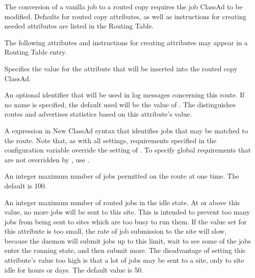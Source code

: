 The conversion of a vanilla job to a routed copy requires the
job ClassAd to be modified.
Defaults for routed copy attributes,
as well as instructions for creating needed attributes 
are listed in the Routing Table.

The following attributes and instructions for creating attributes
may appear in a Routing Table entry.

\begin{description}

\item[GridResource] Specifies the value for the 
attribute that will be inserted into the routed copy ClassAd.

\item[Name] An optional identifier that will be used in log
messages concerning this route.  If no name is specified, the default
used will be the value of .
The  distinguishes routes and advertises
statistics based on this attribute's value.

\item[Requirements] A  expression in New ClassAd
syntax that identifies jobs that may be matched to the route.  Note
that, as with all settings, requirements specified in
the configuration variable
 override the setting of
.  To specify global requirements that
are not overridden by , use
.

\item[MaxJobs] An integer maximum number of jobs permitted on the route at
one time. The default is 100.

\item[MaxIdleJobs] An integer maximum number of routed jobs in the
idle state.  At or above this value, no more jobs will be sent
to this site.
This is intended to prevent too many jobs from being sent to sites
which are too busy to run them.
If the value set for this attribute is too small,
the rate of job submission to the site will slow,
because the  daemon will submit jobs up to this limit,
wait to see some of the jobs enter the running state,
and then submit more.
The disadvantage of setting this attribute's value too high
is that a lot of jobs may be sent
to a site, only to site idle for hours or days.
The default value is 50.


\end{description}
